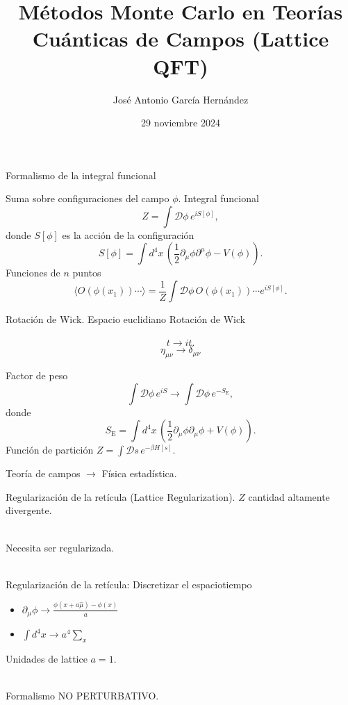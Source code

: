 \documentclass[11pt]{beamer}
\author{José Antonio García Hernández}
\title{Métodos Monte Carlo en Teorías Cuánticas de Campos (Lattice QFT)}
\institute{Instituto de Ciencias Nucleares, UNAM}
\date{29 noviembre 2024}
\begin{document}
\begin{frame}
\titlepage
\end{frame}


\begin{frame}{Formalismo de la integral funcional}

    Suma sobre configuraciones del campo $\phi$. Integral funcional
    $$Z = \int \mathcal{D}\phi \, e^{iS[\phi]},$$
    donde $S[\phi]$ es la acción de la configuración
    $$ S[\phi] = \int d^4 x \, \left( \frac{1}{2}\partial_{\mu}\phi \partial^{\mu}\phi - V(\phi)\right).$$
    Funciones de $n$ puntos
    $$ \langle O(\phi(x_1)) \cdots \rangle =  \frac{1}{Z}\int \mathcal{D}\phi \, O(\phi(x_1))\cdots e^{iS[\phi]}.$$
\end{frame}

\begin{frame}{Rotación de Wick. Espacio euclidiano}
    Rotación de Wick \\~
    $$ t \to i t.$$
    $$ \eta_{\mu\nu} \to \delta_{\mu\nu}$$
        
    Factor de peso 
        $$ \int \mathcal{D}\phi \, e^{iS} \to  \int \mathcal{D}\phi \, e^{-S_{\text{E}}},$$
        donde 
        $$ S_{\text{E}} = \int d^4 x \, \left( \frac{1}{2}\partial_{\mu}\phi \partial_{\mu}\phi + V(\phi)\right).$$
        Función de partición $ Z = \int \mathcal{D}s\, e^{-\beta H[s]}$.
        
        Teoría de campos $\to$ Física estadística. 
\end{frame}

\begin{frame}{Regularización de la retícula (Lattice Regularization).}
    $Z$ cantidad altamente divergente.\\~
    
    Necesita ser regularizada. \\~
    
    Regularización de la retícula:
    Discretizar el espaciotiempo
    \begin{itemize}
         \item $\displaystyle\partial_\mu\phi \to \frac{\phi(x + a\hat{\mu}) - \phi(x)}{a}$
         \item $\displaystyle\int d^4x \to a^4\sum_{x}$
    \end{itemize}
    
    Unidades de lattice $a = 1$. \\~
    
    Formalismo NO PERTURBATIVO.
\end{frame}
\end{document}
